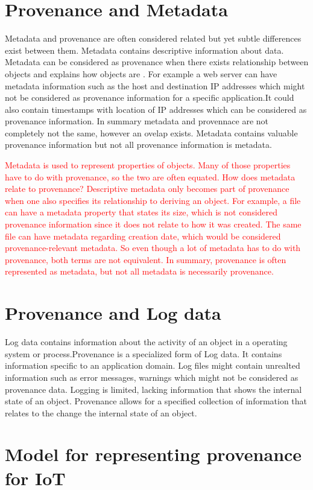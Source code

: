 \section{Provenance and Metadata}
Metadata and provenance are often considered related but yet subtle differences exist between them. Metadata contains descriptive information about data. Metadata can be considered as provenance when there exists relationship between objects and explains how objects are . For example a web server can have metadata information such as the host and destination IP addresses which might not be considered as provenance information for a specific application.It could also contain timestamps with location of IP addresses which can be considered as provenance information. In summary metadata and provennace are not completely not the same, however an ovelap exists. Metadata contains valuable  provenance information but not all provenance information is metadata. 


\textcolor{red}{Metadata is used to represent properties of objects. Many of those properties have to do with provenance, so the two are often equated. How does metadata relate to provenance?
Descriptive metadata only becomes part of provenance when one also specifies its relationship to deriving an object. For example, a file can have a metadata property that states its size, which is not considered provenance information since it does not relate to how it was created. The same file can have metadata regarding creation date, which would be considered provenance-relevant metadata. So even though a lot of metadata has to do with provenance, both terms are not equivalent. In summary, provenance is often represented as metadata, but not all metadata is necessarily provenance.}


\section{Provenance and Log data}
Log data contains information about the activity of an object in a operating system or process.Provenance is a specialized form of Log data. It contains information specific to an application domain. Log files might contain unrealted information such as error messages, warnings which might not be considered as provenance data. Logging is limited, lacking information that shows the internal state of an object. Provenance allows for a specified collection of information that relates to the change the internal state of an object.

\section{Model for representing provenance for IoT}

